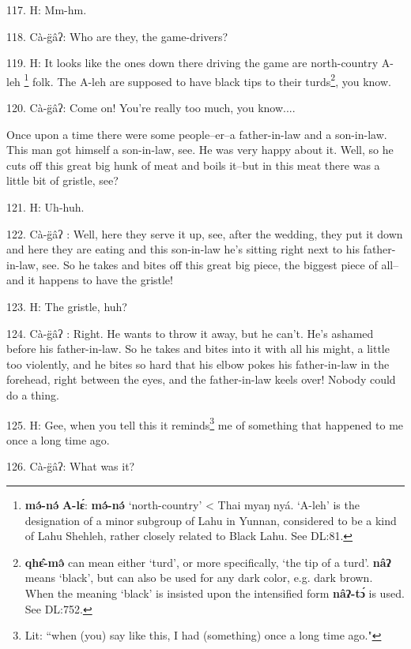 117. H: Mm-hm.

118. Cà-g̈âʔ: Who are they, the game-drivers?

119. H: It looks like the ones down there driving the game are north-country A-leh
\footnote{\textbf{mə́-nə́} \textbf{A-lɛ́}: \textbf{mə́-nə́} `north-country' < Thai myaŋ nyá. `A-leh' is the designation of a minor subgroup of Lahu in Yunnan, considered to be a kind of Lahu Shehleh, rather closely related to Black Lahu. See DL:81.} folk. The A-leh are supposed to have black tips to their turds\footnote{\textbf{qhɛ̂-mə̂} can mean either `turd', or more specifically, `the tip of a turd'. \textbf{nâʔ} means `black', but can also be used for any dark color, e.g. dark brown. When the meaning `black' is insisted upon the intensified form \textbf{nâʔ-tɔ́} is used. See DL:752.}, you know.

120. Cà-g̈âʔ: Come on! You're really too much, you know....

\begin{center}
\end{center}

Once upon a time there were some people--er--a father-in-law and a son-in-law.
This man got himself a son-in-law, see. He was very happy about it. Well, so he
cuts off this great big hunk of meat and boils it--but in this meat there was a
little bit of gristle, see?

121. H: Uh-huh.

122. Cà-g̈âʔ : Well, here they serve it up, see, after the wedding, they put
it down and here they are eating and this son-in-law he's sitting right next to
his father-in-law, see. So he takes and bites off this great big piece, the biggest
piece of all--and it happens to have the gristle!

123. H: The gristle, huh?

124. Cà-g̈âʔ : Right. He wants to throw it away, but he can't. He's ashamed
before his father-in-law. So he takes and bites into it with all his might, a little
too violently, and he bites so hard that his elbow pokes his father-in-law in the
forehead, right between the eyes, and the father-in-law keels over! Nobody could
do a thing.

125. H: Gee, when you tell this it reminds\footnote{Lit: ``when (you) say like this, I had (something) once a long time ago."} me of something that happened to
me once a long time ago.

126. Cà-g̈âʔ: What was it?

